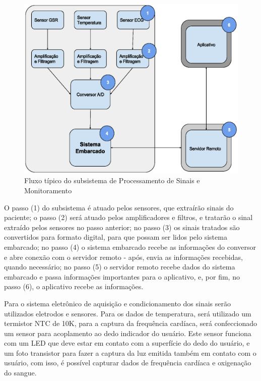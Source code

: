 \begin{figure}[H]
  \centering
    \includegraphics[width=\textwidth]{figuras/arquitetura-monitoramentoecontrole.eps}
  \caption{Fluxo típico do subsistema de Processamento de Sinais e Monitoramento}
  \label{fig:arquitetura-monitoramento-e-controle}
\end{figure}

O passo (1) do subsistema é atuado pelos sensores, que extraírão sinais do paciente;
o passo (2) será atuado pelos amplificadores e filtros, e tratarão o sinal
extraído pelos sensores no passo anterior; no passo (3) os sinais tratados
são convertidos para formato digital, para que possam ser lidos pelo sistema
embarcado; no passo (4) o sistema embarcado recebe as informações do conversor
e abre conexão com o servidor remoto - após, envia as informações recebidas,
quando necessário; no passo (5) o servidor remoto recebe dados do sistema
embarcado e passa informações importantes para o aplicativo, e, por fim,
no passo (6), o aplicativo recebe as informações.

Para o sistema eletrônico de aquisição e condicionamento dos sinais serão 
utilizados eletrodos e sensores. Para os dados de temperatura, será utilizado 
um termistor NTC de 10K, para a captura da frequência cardíaca, será confeccionado 
um sensor para acoplamento ao dedo indicador do usuário. Este sensor funciona 
com um LED que deve estar em contato com a superfície do dedo do usuário, 
e um foto transistor para fazer a captura da luz emitida também em contato 
com o usuário, com isso, é possível capturar dados de frequência cardíaca e oxigenação do sangue.

